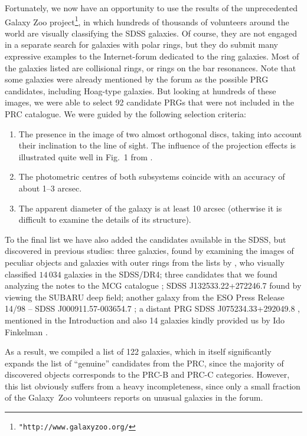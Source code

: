 \documentclass[useAMS,usenatbib]{mn2e}
\begin{document}
Fortunately, we now have an opportunity to use the results of the
unprecedented Galaxy Zoo project\footnote{\texttt{"http://www.galaxyzoo.org/}}, in which hundreds of thousands of
volunteers around the world are visually classifying the SDSS
galaxies. Of course, they are not engaged in a separate search for
galaxies with polar rings, but they do submit many expressive
examples to the Internet-forum dedicated to the ring galaxies. Most of the
galaxies listed are collisional rings, or rings on the bar
resonances. Note that some galaxies were already mentioned by the forum as the
possible PRG candidates, including Hoag-type galaxies. But looking at hundreds of these images, we were able
to select 92 candidate PRGs that were not included in the PRC
catalogue. We were guided by the following selection criteria:


\begin{enumerate}
\item The presence in the image of two almost orthogonal discs,
taking into account their inclination to the line of sight. The
influence of the projection effects is  illustrated quite well in
Fig.~1 from \citet{Whitmore1990}.
\item The photometric centres of both subsystems coincide with an accuracy of about 1--3 arcsec.

\item The apparent diameter of the galaxy is at least 10 arcsec
(otherwise it is difficult to examine the details of its structure).
\end{enumerate}

 To the final list we have also added the
candidates available in the SDSS, but discovered in previous studies:
three galaxies, found by examining the images of peculiar objects and
galaxies with outer rings from the lists by
\citet{NairAbraham2010}, who visually classified  $14\,034$
galaxies in the SDSS/DR4; three candidates that we found analyzing the
notes to the MCG catalogue \citep{MCG};  SDSS
J132533.22+272246.7 found by  \citet{Finkelman2011} viewing the SUBARU deep field; another galaxy from the
ESO Press Release 14/98  -- SDSS J000911.57-003654.7 \citep{Resh2011}; a distant PRG SDSS
J075234.33+292049.8  \citep{Brosch2010}, mentioned in the Introduction  and also 14 galaxies kindly provided us by Ido Finkelman \citep[some of his galaxies are studied in]{FinkelmanNEW}.

As a result, we compiled a list of 122 galaxies, which in itself
significantly expands the list of ``genuine'' candidates from the
PRC, since the majority of discovered objects  corresponds to the
PRC-B and PRC-C categories. However, this list obviously suffers
from a heavy incompleteness, since only a small fraction of the
Galaxy~Zoo volunteers reports on unusual galaxies in the
forum.
\end{document}
